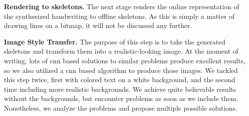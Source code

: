 \textbf{Rendering to skeletons.}
The next stage renders the online representation of the synthesized handwriting to offline skeletons. As this is simply a matter of drawing lines on a bitmap, it will not be discussed any further.

\textbf{Image Style Transfer.}
The purpose of this step is to take the generated skeletons and transform them into a realistic-looking image. At the moment of writing, lots of \gls{cnn} based solutions to similar problems produce excellent results, so we also utilized a \gls{cnn} based algorithm to produce those images. We tackled this step twice, first with colored text on a white background, and the second time including more realistic backgrounds. We achieve quite believable results without the backgrounds, but encounter problems as soon as we include them. Nonetheless, we analyze the problems and propose multiple possible solutions.




